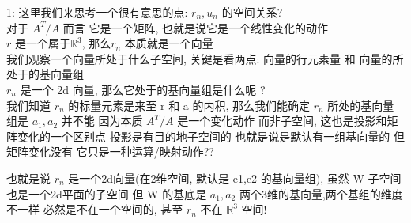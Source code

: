 \documentclass[12pt]{article}
\begin{document}
\begin{flushleft}
    1: 这里我们来思考一个很有意思的点: $r_{n}, u_{n}$ 的空间关系? \\
    对于 $A^{T}/A$ 而言 它是一个矩阵, 也就是说它是一个线性变化的动作  \\
    $r$ 是一个属于$\mathbb{R}^{3}$, 那么$r_{n}$ 本质就是一个向量 \\
    我们观察一个向量所处于什么子空间, 关键是看两点: 向量的行元素量 和 向量的所处于的基向量组 \\
    $r_{n}$ 是一个 2d 向量, 那么它处于的基向量组是什么呢 ? \\
    我们知道 $r_{n}$ 的标量元素是来至 r 和 a 的内积, 那么我们能确定 $r_{n}$ 所处的基向量组是 ${a_{1}, a_{2}}$
    并不能 因为本质  $A^{T}/A$ 是一个变化动作 而非子空间, 这也是投影和矩阵变化的一个区别点
    投影是有目的地子空间的 也就是说是默认有一组基向量的
    但矩阵变化没有 它只是一种运算/映射动作??

    也就是说 $r_{n}$ 是一个2d向量(在2维空间, 默认是 e1,e2 的基向量组), 虽然 W 子空间也是一个2d平面的子空间 但 W 的基底是  ${a_{1}, a_{2}}$
    两个3维的基向量,两个基组的维度不一样 必然是不在一个空间的, 甚至 $r_{n}$ 不在 $\mathbb{R}^{3}$ 空间!



\end{flushleft}
\end{document}
